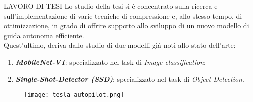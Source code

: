 \begin{frame}{LAVORO DI TESI}
    Lo studio della tesi si è concentrato sulla ricerca e sull'implementazione 
    di varie tecniche di compressione e, allo stesso tempo, di ottimizzazione, in grado di offrire supporto allo sviluppo di un nuovo modello di guida autonoma efficiente.\\
    \vspace{0.3cm}
    Quest'ultimo, deriva dallo studio di due modelli già noti allo stato dell'arte:
    \begin{minipage}{\linewidth}
        \centering
        \begin{minipage}{0.45\linewidth}
            \begin{enumerate}
                \item {\bfseries{\emph{MobileNet-V1}}}\footnotemark[1]: specializzato nel task di \emph{Image classification};
                \item {\bfseries{\emph{Single-Shot-Detector (SSD)}}}\footnotemark[2]: specializzato nel task di \emph{Object Detection}.
            \end{enumerate}
        \end{minipage}
        \begin{minipage}{0.45\linewidth}
            \begin{figure}
                \centering
                \texttt{[image: tesla\_autopilot.png]}
                \centering
            \end{figure}
        \end{minipage}
    \end{minipage}
    
\end{frame}